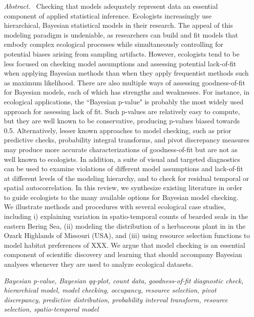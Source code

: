 \documentclass[12pt,english]{article}
\begin{document}
\begin{spacing}{1.9}
{\em Abstract.\ }  Checking that models adequately represent data an essential component of applied statistical inference.  Ecologists increasingly use hierarchical, Bayesian statistical models in their research.  The appeal of this modeling paradigm is undeniable, as researchers can build and fit models that embody complex ecological processes while simultaneously controlling for potential biases arising from sampling artifacts. However, ecologists tend to be less focused on checking model assumptions and assessing potential lack-of-fit when applying Bayesian methods than when they apply frequentist methods such as maximum likelihood.  There are also multiple ways of assessing goodness-of-fit for Bayesian models, each of which has strengths and weaknesses.  For instance, in ecological applications, the ``Bayesian p-value" is probably the most widely used approach for assessing lack of fit. Such p-values are relatively easy to compute, but they are well known to be conservative, producing p-values biased towards 0.5.  Alternatively, lesser known approaches to model checking, such as prior predictive checks, probability integral transforms, and pivot discrepancy measures may produce more accurate characterizations of goodness-of-fit but are not as well known to ecologists.  In addition, a suite of visual and targeted diagnostics can be used to examine violations of different model assumptions and lack-of-fit at different levels of the modeling hierarchy, and to check for residual temporal or spatial autocorrelation.  In this review, we synthesize existing literature in order to guide ecologists to the many available options for Bayesian model checking.  We illustrate methods and procedures with several ecological case studies, including i) explaining variation in spatio-temporal counts of bearded seals in the eastern Bering Sea, (ii) modeling the distribution of a herbaceous plant in in the Ozark Highlands of Missouri (USA), and (iii) using resource selection functions to model habitat preferences of XXX.  We argue that model checking is an essential component of scientific discovery and learning that should accompany Bayesian analyses whenever they are used to analyze ecological datasets.


{\em Bayesian p-value, Bayesian qq-plot, count data, goodness-of-fit diagnostic check, hierarchical model, model checking, occupancy, resource selection, pivot discrepancy, predictive distribution, probability interval transform, resource selection, spatio-temporal model}




\end{spacing}
\end{document}
